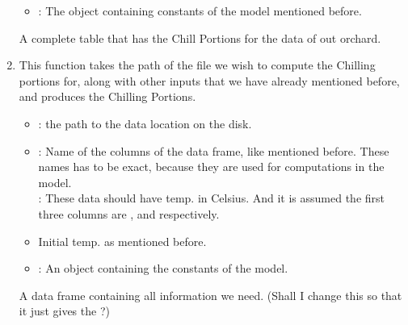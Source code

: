 \begin{enumerate}
\begin{itemize}
\item {}: The object containing constants of the model
mentioned before.
 \end{itemize}
 
 A complete table that has the Chill Portions for the 
data of out orchard.

\item {}

This function takes the path of the file we wish 
to compute the Chilling portions for, along with 
other inputs that we have already mentioned 
before, and produces the Chilling Portions.

\begin{itemize}
\item {}: the path to the data location on the disk.
\item {}: Name of the columns 
of the data frame, like mentioned before. These 
names has to be exact, because they are used for
computations in the model.\\

{}: These data should have temp. in 
Celsius. And it is assumed the first three columns 
are ,  and  respectively.\\

\item {} Initial temp. as mentioned before.

\item {}: An object containing the constants of the model.
\end{itemize}

 A data frame containing all information we need. 
(Shall I change this so that it just gives the ?)

\end{enumerate}

